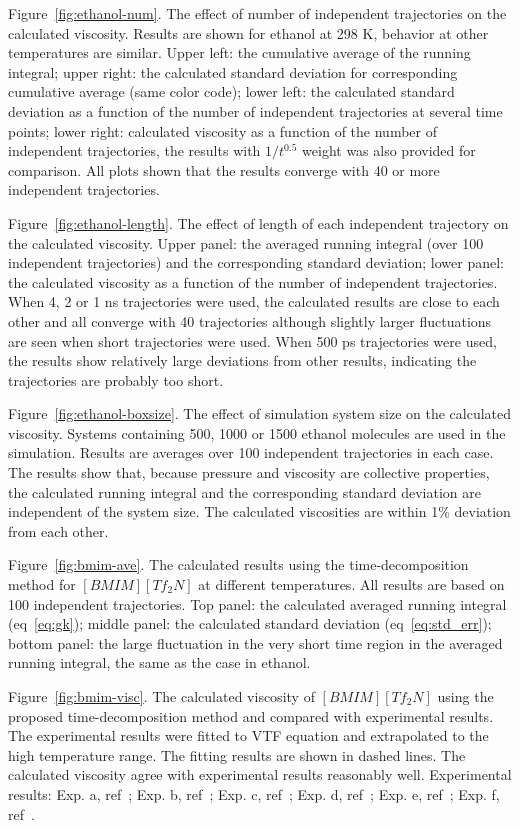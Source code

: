 \documentclass[12pt]{article}
\begin{document}
Figure~\ref{fig:ethanol-num}.
The effect of number of independent trajectories on the calculated viscosity.
Results are shown for ethanol at 298 K, behavior at other temperatures are similar.
Upper left: the cumulative average of the running integral;
upper right: the calculated standard deviation for corresponding cumulative average (same color code);
lower left: the calculated standard deviation as a function of the number of independent trajectories at several time points;
lower right: calculated viscosity as a function of the number of independent trajectories,
the results with $1/t^{0.5}$ weight was also provided for comparison.
All plots shown that the results  converge with 40 or more independent trajectories.


Figure~\ref{fig:ethanol-length}.
The effect of length of each independent trajectory on the calculated viscosity.
Upper panel: the averaged running integral (over 100 independent trajectories) and the corresponding standard deviation;
lower panel: the calculated viscosity as a function of the number of independent trajectories.
When 4, 2 or 1 ns trajectories were used,
the calculated results are close to each other
and all converge with 40 trajectories although slightly larger fluctuations are seen when short trajectories were used.
When 500 ps trajectories were used,
the results show relatively large deviations from other results,
indicating the trajectories are probably too short.

Figure~\ref{fig:ethanol-boxsize}.
The effect of simulation system size on the calculated viscosity.
Systems containing 500, 1000 or 1500 ethanol molecules are used in the simulation.
Results are averages over 100 independent trajectories in each case.
The results show that,
because pressure and viscosity are collective properties,
the calculated running integral and the corresponding standard deviation are independent of the system size.
The calculated viscosities are within 1\% deviation from each other.

Figure~\ref{fig:bmim-ave}.
The calculated results using the time-decomposition method for $[BMIM][Tf_2N]$ at different temperatures.
All results are based on 100 independent trajectories.
Top panel: the calculated averaged running integral (eq~\ref{eq:gk});
middle panel: the calculated standard deviation (eq~\ref{eq:std_err});
bottom panel: the large fluctuation in the very short time region in the averaged running integral,
the same as the case in ethanol.

Figure~\ref{fig:bmim-visc}.
The calculated viscosity of $[BMIM][Tf_2N]$ using the proposed time-decomposition method
and compared with experimental results.
The experimental results were fitted to VTF equation
and extrapolated to the high temperature range.
The fitting results are shown in dashed lines.
The calculated viscosity agree with experimental results reasonably well.
Experimental results: 
Exp. a, ref~\cite{Gadzuric.JCED.57.1072.2012};
Exp. b, ref~\cite{Katsuta.JCED.55.1588.2010};
Exp. c, ref~\cite{Watanabe.JPCB.110.19593.2006};
Exp. d, ref~\cite{Majer.GC.8.172.2006};
Exp. e, ref~\cite{Watanabe.JPCB.109.6103.2005};
Exp. f, ref~\cite{VanderNoot.JEC.568.167.2004}.
\end{document}

